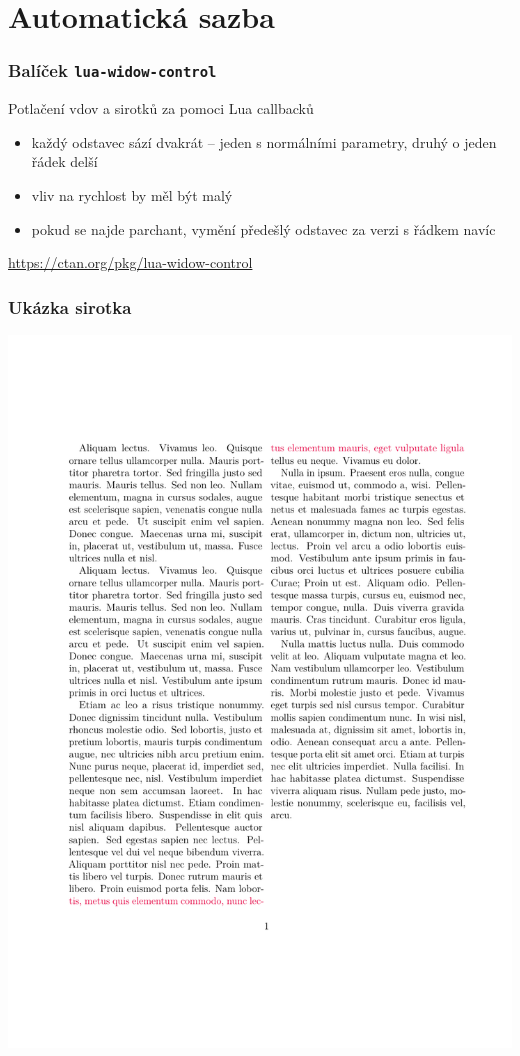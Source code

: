 \section{Automatická sazba}

\begin{frame}
  \frametitle{Balíček \texttt{lua-widow-control}}
  Potlačení vdov a sirotků za pomoci Lua callbacků
  \begin{itemize}
    \item každý odstavec sází dvakrát -- jeden s normálními parametry, druhý o jeden řádek delší
    \item vliv na rychlost by měl být malý
    
    \item pokud se najde parchant, vymění předešlý odstavec za verzi s řádkem navíc
  \end{itemize}
  \url{https://ctan.org/pkg/lua-widow-control}
\end{frame}

\begin{frame}
  \frametitle{Ukázka sirotka}
  \begin{center}
    \includegraphics[height=\textheight,page=1]{examples/widow.pdf}
  \end{center}
\end{frame}

